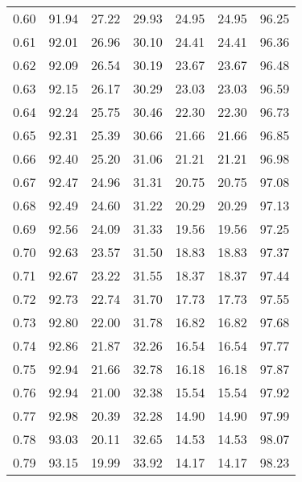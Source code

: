\begin{tabular}{|c|c|c|c|c|c|c|}
      0.60 &     91.94 &     27.22 &      29.93 &   24.95 &      24.95 &         96.25 \\
      0.61 &     92.01 &     26.96 &      30.10 &   24.41 &      24.41 &         96.36 \\
      0.62 &     92.09 &     26.54 &      30.19 &   23.67 &      23.67 &         96.48 \\
      0.63 &     92.15 &     26.17 &      30.29 &   23.03 &      23.03 &         96.59 \\
      0.64 &     92.24 &     25.75 &      30.46 &   22.30 &      22.30 &         96.73 \\
      0.65 &     92.31 &     25.39 &      30.66 &   21.66 &      21.66 &         96.85 \\
      0.66 &     92.40 &     25.20 &      31.06 &   21.21 &      21.21 &         96.98 \\
      0.67 &     92.47 &     24.96 &      31.31 &   20.75 &      20.75 &         97.08 \\
      0.68 &     92.49 &     24.60 &      31.22 &   20.29 &      20.29 &         97.13 \\
      0.69 &     92.56 &     24.09 &      31.33 &   19.56 &      19.56 &         97.25 \\
      0.70 &     92.63 &     23.57 &      31.50 &   18.83 &      18.83 &         97.37 \\
      0.71 &     92.67 &     23.22 &      31.55 &   18.37 &      18.37 &         97.44 \\
      0.72 &     92.73 &     22.74 &      31.70 &   17.73 &      17.73 &         97.55 \\
      0.73 &     92.80 &     22.00 &      31.78 &   16.82 &      16.82 &         97.68 \\
      0.74 &     92.86 &     21.87 &      32.26 &   16.54 &      16.54 &         97.77 \\
      0.75 &     92.94 &     21.66 &      32.78 &   16.18 &      16.18 &         97.87 \\
      0.76 &     92.94 &     21.00 &      32.38 &   15.54 &      15.54 &         97.92 \\
      0.77 &     92.98 &     20.39 &      32.28 &   14.90 &      14.90 &         97.99 \\
      0.78 &     93.03 &     20.11 &      32.65 &   14.53 &      14.53 &         98.07 \\
      0.79 &     93.15 &     19.99 &      33.92 &   14.17 &      14.17 &         98.23 \\

\end{tabular}
